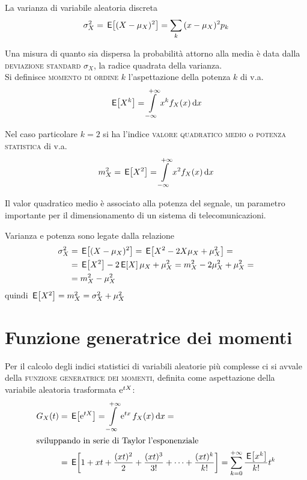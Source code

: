 La varianza di variabile aleatoria discreta
\begin{equation}
\label{eq:v_a_varianza_discreta}
	\sigma^2_X=\,{\operatorname{\mathsf{E}}}\!\left[{(X-\mu_X)^2}\right]=\sum_k {(x-\mu_X)^2 p_k}
\end{equation}

Una misura di quanto sia dispersa la probabilità attorno alla media è data dalla \textsc{deviazione standard} $\sigma_X$, la radice quadrata della varianza.\\

Si definisce \textsc{momento di ordine $k$} l'aspettazione della potenza $k$ di v.a.
\begin{equation}
	\,{\operatorname{\mathsf{E}}}\!\left[{X^k}\right]=\int\limits_{-\infty}^{+\infty}{x^k f_X(x)}{\,\mathop{}\!\mathrm{d}{x}}
\end{equation}

Nel caso particolare $k=2$ si ha l'indice \textsc{valore quadratico medio} o \textsc{potenza statistica} di v.a.
\begin{equation}
\label{eq:v_a_valore_quad_medio}
	m^2_X=\,{\operatorname{\mathsf{E}}}\!\left[{X^2}\right]=\int\limits_{-\infty}^{+\infty}{x^2 f_X(x)}{\,\mathop{}\!\mathrm{d}{x}}
\end{equation}
\begin{nota}
	Il valor quadratico medio è associato alla potenza del segnale, un parametro importante per il dimensionamento di un sistema di telecomunicazioni.
\end{nota}
Varianza e potenza sono legate dalla relazione
\begin{equation}
	\begin{split}
		\sigma^2_X&=\,{\operatorname{\mathsf{E}}}\!\left[{(X-\mu_X)^2}\right]=\,{\operatorname{\mathsf{E}}}\!\left[{X^2-2X\mu_X+\mu^2_X}\right]=\\
		&=\,{\operatorname{\mathsf{E}}}\!\left[{X^2}\right]-2\,{\operatorname{\mathsf{E}}}\!\left[{X}\right]\mu_X+\mu^2_X=m^2_X-2\mu^2_X+\mu^2_X=\\
		&=m^2_X-\mu^2_X
	\end{split}
\end{equation}
quindi $\,{\operatorname{\mathsf{E}}}\!\left[{X^2}\right]=m^2_X=\sigma^2_X+\mu^2_X$

\section{Funzione generatrice dei momenti}
Per il calcolo degli indici statistici di variabili aleatorie più complesse ci si avvale della \textsc{funzione generatrice dei momenti}, definita come aspettazione della variabile aleatoria trasformata $\operatorname{e}^{t X}$:
\begin{equation}
	\begin{split}
		G_X(t)&=\,{\operatorname{\mathsf{E}}}\!\left[{\operatorname{e}^{t X}}\right]=\int\limits_{-\infty}^{+\infty}{\operatorname{e}^{t x}f_X(x)}{\,\mathop{}\!\mathrm{d}{x}}=\\
\intertext{sviluppando in serie di Taylor l'esponenziale}
		&=\,{\operatorname{\mathsf{E}}}\!\left[{1+x t+\frac{(x t)^2}{2}+\frac{(x t)^3}{3!}+\dots+\frac{(x t)^k}{k!}}\right]=\sum_{k=0}^{+\infty}{\frac{\,{\operatorname{\mathsf{E}}}\!\left[{x^k}\right]}{k!}t^k}
	\end{split}
\end{equation}

